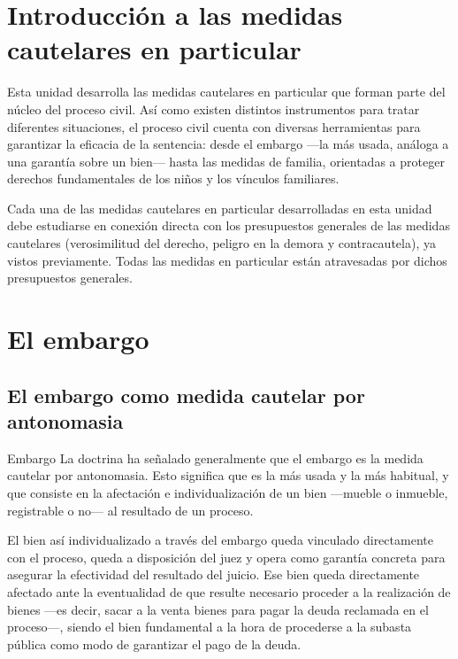 \documentclass[12pt,oneside]{book}
\begin{document}
\chapter{Introducción a las medidas cautelares en particular}

Esta unidad desarrolla las medidas cautelares en particular que forman parte del núcleo del proceso civil. Así como existen distintos instrumentos para tratar diferentes situaciones, el proceso civil cuenta con diversas herramientas para garantizar la eficacia de la sentencia: desde el embargo ---la más usada, análoga a una garantía sobre un bien--- hasta las medidas de familia, orientadas a proteger derechos fundamentales de los niños y los vínculos familiares.

\begin{important}
Cada una de las medidas cautelares en particular desarrolladas en esta unidad debe estudiarse en conexión directa con los presupuestos generales de las medidas cautelares (verosimilitud del derecho, peligro en la demora y contracautela), ya vistos previamente. Todas las medidas en particular están atravesadas por dichos presupuestos generales.
\end{important}

\chapter{El embargo}

\section{El embargo como medida cautelar por antonomasia}

\begin{definition}{Embargo}
La doctrina ha señalado generalmente que el embargo es la medida cautelar por antonomasia. Esto significa que es la más usada y la más habitual, y que consiste en la afectación e individualización de un bien ---mueble o inmueble, registrable o no--- al resultado de un proceso.
\end{definition}

El bien así individualizado a través del embargo queda vinculado directamente con el proceso, queda a disposición del juez y opera como garantía concreta para asegurar la efectividad del resultado del juicio. Ese bien queda directamente afectado ante la eventualidad de que resulte necesario proceder a la realización de bienes ---es decir, sacar a la venta bienes para pagar la deuda reclamada en el proceso---, siendo el bien fundamental a la hora de procederse a la subasta pública como modo de garantizar el pago de la deuda.
\end{document}

